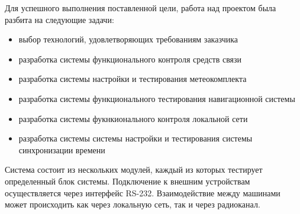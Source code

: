 Для успешного выполнения поставленной цели, работа над проектом была разбита на следующие задачи:
\begin{itemize}
    \item выбор технологий, удовлетворяющих требованиям заказчика
    \item разработка системы функционального контроля средств связи
    \item разработка системы настройки и тестирования метеокомплекта
    \item разработка системы функционального тестирования навигационной системы
    \item разработка системы фукнкионального контроля локальной сети
    \item разработка системы системы настройки и тестирования системы синхронизации времени
\end{itemize}

Система состоит из нескольких модулей, каждый из которых тестирует определенный блок системы.
Подключение к внешним устройствам осуществляется через интерфейс RS-232.
Взаимодействие между машинами может происходить как через локальную сеть, так и через радиоканал.
